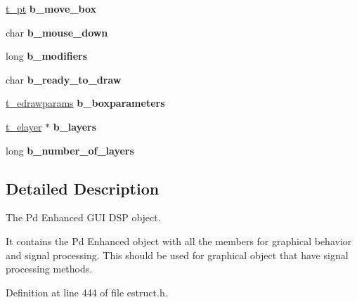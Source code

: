 \begin{DoxyCompactItemize}
\item 
\hypertarget{struct__edspbox_a2b028829ae54f8ccede6bb0d5903f7fd}{\hyperlink{struct__pt}{t\-\_\-pt} {\bfseries b\-\_\-move\-\_\-box}}\label{struct__edspbox_a2b028829ae54f8ccede6bb0d5903f7fd}

\item 
\hypertarget{struct__edspbox_a1dc439a4d35e98f78370c81ceadc8ea0}{char {\bfseries b\-\_\-mouse\-\_\-down}}\label{struct__edspbox_a1dc439a4d35e98f78370c81ceadc8ea0}

\item 
\hypertarget{struct__edspbox_ad230697acdd2d00abb2dc18dd38089d8}{long {\bfseries b\-\_\-modifiers}}\label{struct__edspbox_ad230697acdd2d00abb2dc18dd38089d8}

\item 
\hypertarget{struct__edspbox_a234ea03e103bd45f5fa1d27b8e69b5dd}{char {\bfseries b\-\_\-ready\-\_\-to\-\_\-draw}}\label{struct__edspbox_a234ea03e103bd45f5fa1d27b8e69b5dd}

\item 
\hypertarget{struct__edspbox_a01fa53a36dc717c81755d805a868ad9d}{\hyperlink{struct__edrawparams}{t\-\_\-edrawparams} {\bfseries b\-\_\-boxparameters}}\label{struct__edspbox_a01fa53a36dc717c81755d805a868ad9d}

\item 
\hypertarget{struct__edspbox_ad80949f483467d74761a9e321300d64e}{\hyperlink{struct__elayer}{t\-\_\-elayer} $\ast$ {\bfseries b\-\_\-layers}}\label{struct__edspbox_ad80949f483467d74761a9e321300d64e}

\item 
\hypertarget{struct__edspbox_a84105957ca11a224cf734f350fb23ac9}{long {\bfseries b\-\_\-number\-\_\-of\-\_\-layers}}\label{struct__edspbox_a84105957ca11a224cf734f350fb23ac9}

\end{DoxyCompactItemize}


\subsection{Detailed Description}
The Pd Enhanced G\-U\-I D\-S\-P object. 

It contains the Pd Enhanced object with all the members for graphical behavior and signal processing. This should be used for graphical object that have signal processing methods. 

Definition at line 444 of file estruct.\-h.




